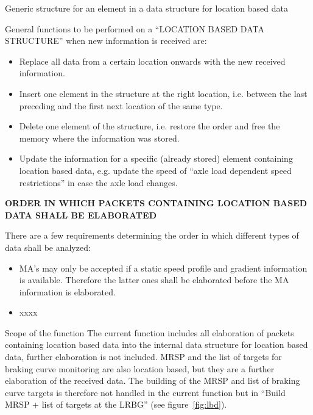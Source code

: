 \documentclass{template/openetcs_report}
\begin{document}
Generic structure for an element in a data structure for location based data


General functions to be performed on a “LOCATION BASED DATA STRUCTURE” when new information is received are:
\begin{itemize}
\item Replace all data from a certain location onwards with the new received information.
\item Insert one element in the structure at the right location, i.e. between the last preceding and the first next location of the same type.
\item Delete one element of the structure, i.e. restore the order and free the memory where the information was stored.
\item Update the information for a specific (already stored) element containing location based data, e.g. update the speed of “axle load dependent speed restrictions” in case the axle load changes.
\end{itemize}

\textbf{ORDER IN WHICH PACKETS CONTAINING LOCATION BASED DATA SHALL BE ELABORATED}

There are a few requirements determining the order in which different types of data shall be analyzed:
\begin{itemize}
\item MA's may only be accepted if a static speed profile and gradient information is available. Therefore the latter ones shall be elaborated before the MA information is elaborated.
\item xxxx
\end{itemize}

Scope of the function
The current function includes all elaboration of packets containing location based data into the internal data structure for location based data, further elaboration is not included.
MRSP and the list of targets for braking curve monitoring are also location based, but they are a further elaboration of the received data. The building of the MRSP and list of braking curve targets is therefore not handled in the current function but in “Build MRSP + list of targets at the LRBG” (see figure~\ref{fig:lbd}).
\end{document}
